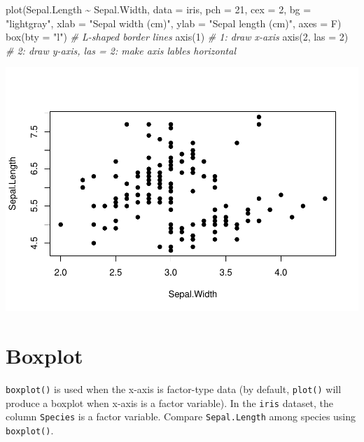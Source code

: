 \documentclass[
]{book}
\newenvironment{Shaded}{\begin{snugshade}}{\end{snugshade}}
\newcommand{\AttributeTok}[1]{\textcolor[rgb]{0.77,0.63,0.00}{#1}}
\newcommand{\CommentTok}[1]{\textcolor[rgb]{0.56,0.35,0.01}{\textit{#1}}}
\newcommand{\DecValTok}[1]{\textcolor[rgb]{0.00,0.00,0.81}{#1}}
\newcommand{\FunctionTok}[1]{\textcolor[rgb]{0.00,0.00,0.00}{#1}}
\newcommand{\NormalTok}[1]{#1}
\newcommand{\SpecialCharTok}[1]{\textcolor[rgb]{0.00,0.00,0.00}{#1}}
\newcommand{\StringTok}[1]{\textcolor[rgb]{0.31,0.60,0.02}{#1}}
\begin{document}
\begin{Shaded}
\begin{Highlighting}[]
\FunctionTok{plot}\NormalTok{(Sepal.Length }\SpecialCharTok{\textasciitilde{}}\NormalTok{ Sepal.Width, }\AttributeTok{data =}\NormalTok{ iris,}
     \AttributeTok{pch =} \DecValTok{21}\NormalTok{, }\AttributeTok{cex =} \DecValTok{2}\NormalTok{, }\AttributeTok{bg =} \StringTok{"lightgray"}\NormalTok{,}
     \AttributeTok{xlab =} \StringTok{"Sepal width (cm)"}\NormalTok{, }\AttributeTok{ylab =} \StringTok{"Sepal length (cm)"}\NormalTok{,}
     \AttributeTok{axes =}\NormalTok{ F)}
\FunctionTok{box}\NormalTok{(}\AttributeTok{bty =} \StringTok{"l"}\NormalTok{) }\CommentTok{\# L{-}shaped border lines}
\FunctionTok{axis}\NormalTok{(}\DecValTok{1}\NormalTok{) }\CommentTok{\# 1: draw x{-}axis}
\FunctionTok{axis}\NormalTok{(}\DecValTok{2}\NormalTok{, }\AttributeTok{las =} \DecValTok{2}\NormalTok{) }\CommentTok{\# 2: draw y{-}axis, las = 2: make axis lables horizontal}
\end{Highlighting}
\end{Shaded}

\begin{center}\includegraphics{biostats_files/figure-latex/unnamed-chunk-122-1} \end{center}

\hypertarget{boxplot-1}{%
\section{Boxplot}\label{boxplot-1}}

\texttt{boxplot()} is used when the x-axis is factor-type data (by default, \texttt{plot()} will produce a boxplot when x-axis is a factor variable). In the \texttt{iris} dataset, the column \texttt{Species} is a factor variable. Compare \texttt{Sepal.Length} among species using \texttt{boxplot()}.
\end{document}
